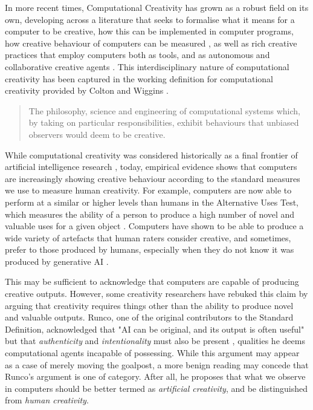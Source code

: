 In more recent times, Computational Creativity has grown as a robust field on its own, developing across a literature that seeks to formalise what it means for a computer to be creative, how this can be implemented in computer programs, how creative behaviour of computers can be measured \cite{Ritchie2007-jy, Colton2008-fh, Colton2011-uy, Maher2012-oj, Jordanous2012-kw}, as well as rich creative practices that employ computers both as tools, and as autonomous and collaborative creative agents \cite{Cohen1995-wt, Colton2015-qr, Perez-y-Perez1999-ma, Cope1992-pq, Reichardt1968-eo}. This interdisciplinary nature of computational creativity has been captured in the working definition for computational creativity provided by Colton and Wiggins \cite{Colton2021-bt}.

\begin{quote}
The philosophy, science and engineering of computational systems which, by taking on particular responsibilities, exhibit behaviours that unbiased observers would deem to be creative.
\end{quote}

While computational creativity was considered historically as a final frontier of artificial intelligence research \cite{Colton2021-bt}, today, empirical evidence shows that computers are increasingly showing creative behaviour according to the standard measures we use to measure human creativity. For example, computers are now able to perform at a similar or higher levels than humans in the Alternative Uses Test, which measures the ability of a person to produce a high number of novel and valuable uses for a given object \cite{Hubert2024-kv, Guzik2023-cl}. Computers have shown to be able to produce a wide variety of artefacts that human raters consider creative, and sometimes, prefer to those produced by humans, especially when they do not know it was produced by generative AI \cite{Alexander2024-pz, Wu2025-or, Kobis2021-bb}. 

This may be sufficient to acknowledge that computers are capable of producing creative outputs. However, some creativity researchers have rebuked this claim by arguing that creativity requires things other than the ability to produce novel and valuable outputs. Runco, one of the original contributors to the Standard Definition, acknowledged that "AI can be original, and its output is often useful" but that \emph{authenticity} and \emph{intentionality} must also be present \cite{Runco2025-bu}, qualities he deems computational agents incapable of possessing. While this argument may appear as a case of merely moving the goalpost, a more benign reading may concede that Runco's argument is one of category. After all, he proposes that what we observe in computers should be better termed as \textit{artificial creativity}, and be distinguished from \textit{human creativity}. 

